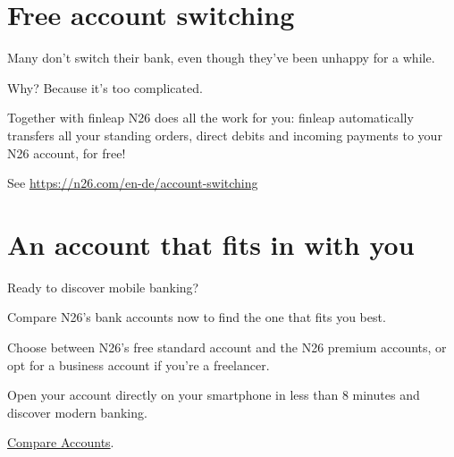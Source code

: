 \documentclass[onsided]{book}
\numberwithin{equation}{section}
\begin{document}
\section{Free account switching}
Many don't switch their bank, even though they've been unhappy for a while.

Why? Because it's too complicated.

Together with finleap N26 does all the work for you: finleap automatically transfers all your standing orders, direct debits and incoming payments to your N26 account, for free!

See \url{https://n26.com/en-de/account-switching}

\section{An account that fits in with you}
Ready to discover mobile banking?

Compare N26's bank accounts now to find the one that fits you best.

Choose between N26's free standard account and the N26 premium accounts, or opt for a business account if you're a freelancer.

Open your account directly on your smartphone in less than 8 minutes and discover modern banking.

\href{https://n26.com/en-de/plans}{Compare Accounts}.
\end{document}

